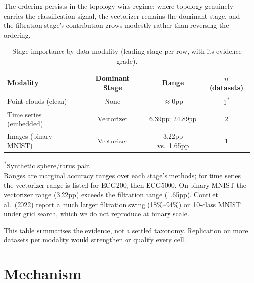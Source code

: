\documentclass[12pt, a4paper]{report}
\theoremstyle{definition}
\theoremstyle{plain}
\theoremstyle{remark}
\begin{document}
The ordering persists in the topology-wins regime: where topology genuinely carries the classification signal, the vectorizer remains the dominant stage, and the filtration stage's
contribution grows modestly rather than reversing the ordering.

\begin{table}[H]
  \centering
  \caption{Stage importance by data modality (leading stage per row,
  with its evidence grade).}
  \label{tab:stage_summary}
  \begin{tabular}{lccc}
    \toprule
    Modality & Dominant Stage & Range & $n$ (datasets) \\
    \midrule
    Point clouds (clean) & None & $\approx$0pp & 1\textsuperscript{*} \\
    Time series (embedded) & Vectorizer & 6.39pp; 24.89pp & 2 \\
    Images (binary MNIST) & Vectorizer & 3.22pp vs.~1.65pp & 1 \\
    \bottomrule
  \end{tabular}

  \vspace{0.3cm}
  \footnotesize{\textsuperscript{*}Synthetic sphere/torus pair.\\
    Ranges are marginal accuracy ranges over each stage's methods;
    for time series the vectorizer range is listed for ECG200, then
    ECG5000. On binary MNIST the vectorizer range (3.22pp) exceeds
    the filtration range (1.65pp). Conti et al.~(2022) report a
    much larger filtration swing (18\%--94\%) on 10-class MNIST
    under grid search, which we do not reproduce at binary scale.}
\end{table}

This table summarises the evidence, not a settled taxonomy.
Replication on more datasets per modality would strengthen
or qualify every cell.

\section{Mechanism}
\end{document}
